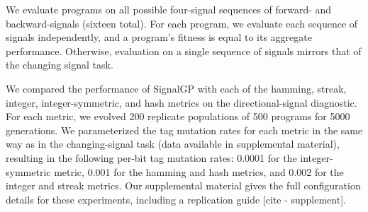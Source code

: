 We evaluate programs on all possible four-signal sequences of forward- and backward-signals (sixteen total).
For each program, we evaluate each sequence of signals independently, and a program's fitness is equal to its aggregate performance.
Otherwise, evaluation on a single sequence of signals mirrors that of the changing signal task.

We compared the performance of SignalGP with each of the hamming, streak, integer, integer-symmetric, and hash metrics on the directional-signal diagnostic.
For each metric, we evolved 200 replicate populations of 500 programs for 5000 generations.
We parameterized the tag mutation rates for each metric in the same way as in the changing-signal task (data available in supplemental material), resulting in the following per-bit tag mutation rates: 0.0001 for the integer-symmetric metric, 0.001 for the hamming and hash metrics, and 0.002 for the integer and streak metrics.
Our supplemental material gives the full configuration details for these experiments, including a replication guide [cite - supplement].

